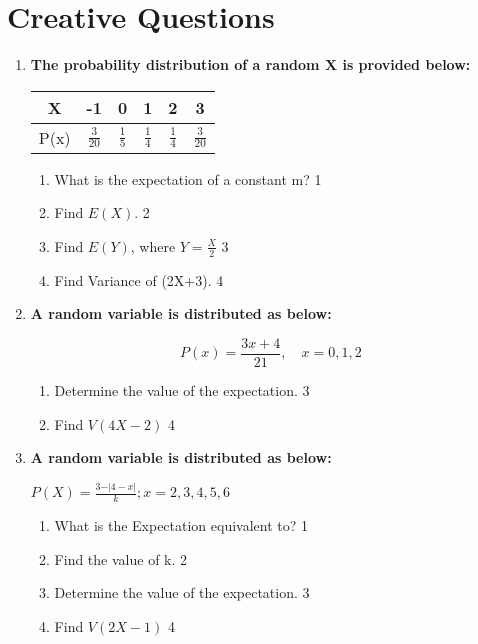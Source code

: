 \documentclass[a4paper,oneside, margin=1.4in]{book}
\begin{document}
\section{Creative Questions}
  \begin{enumerate}
  
   \item
	  \textbf{The probability distribution of a random X is provided below:} 
	  
	  \begin{table}[h]
	  \centering
\begin{tabular}{c|ccccc}
X & -1 & 0 & 1 & 2 & 3 \\ \hline
P(x) & $\frac 3{20}$ & $\frac 15$ & $\frac 14$ & $\frac 14$ & $\frac 3{20}$
\end{tabular}
\end{table}
  
  \begin{enumerate}
    \item
	What is the expectation of a constant m? \hfill 1
    \item
	Find $E(X).$ \hfill 2
    \item  
	Find $E(Y)$, where $Y = \frac X2$  \hfill 3
    \item
	Find Variance of (2X+3). \hfill 4
  \end{enumerate}
  
    
        \item \textbf{A random variable is distributed as below:}
        
        \begin{center}
  \textbf{\[
P(x) = \frac{3x + 4}{21}, \quad x = 0, 1, 2
\]
}
  \end{center}

  \begin{enumerate}
    \item
    	Determine the value of the expectation. \hfill 3
     \item
     	Find $V(4X-2)$ \hfill 4
  \end{enumerate}
  
        \item \textbf{A random variable is distributed as below:}
        
        \begin{center}
  \textbf{$P(X) = \frac{3-\vert 4-x\vert}{k}; x=2,3,4,5,6$}
  \end{center}

  \begin{enumerate}
    \item
	What is the Expectation equivalent to? \hfill 1
    \item
    	Find the value of k. \hfill 2
    \item
    	Determine the value of the expectation. \hfill 3
     \item
     	Find $V(2X-1)$ \hfill 4
  \end{enumerate}
  

\end{enumerate}
\end{document}
